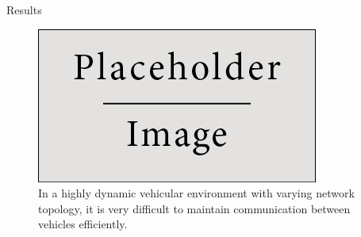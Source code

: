 \documentclass[final]{beamer}
\newlength{\onecolwid}
\newlength{\twocolwid}
\begin{document}
\begin{frame}[t]
\begin{columns}[t]
\begin{column}{\twocolwid}
\begin{columns}[t,totalwidth=\twocolwid]
\begin{column}{\onecolwid}

\end{column} %

\begin{column}{\onecolwid}\vspace{-1.3in} %


\begin{block}{Results}
\begin{figure}
\includegraphics[width=\textwidth,keepaspectratio]{placeholder.jpg}
\caption{In a highly dynamic vehicular environment with varying network topology, it is very difficult to maintain communication between vehicles efficiently.}
\end{figure} 
\end{block}


\end{column} %

\end{columns} %



\end{column}
\end{columns}
\end{frame}
\end{document}
